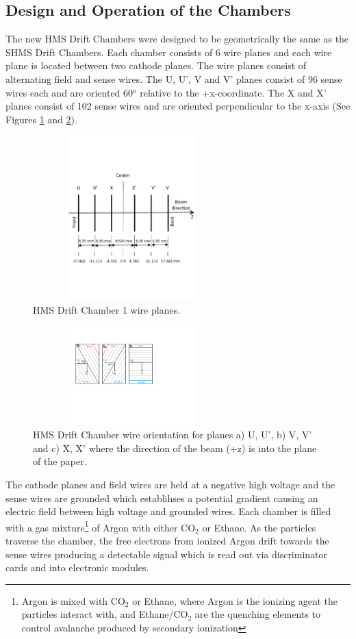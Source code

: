 \documentclass[letterpaper, 10 pt, conference]{ieeeconf}  %
\begin{document}
\subsection{Design and Operation of the Chambers}
The new HMS Drift Chambers were designed to be geometrically the same as the SHMS Drift Chambers. Each chamber consists of 6 wire planes and each wire
plane is located between two cathode planes. The wire planes consist of alternating field and sense wires. The U, U', V and V' planes consist of
96 sense wires each and are oriented 60$^{o}$ relative to the +x-coordinate. The X and X' planes consist of 102 sense wires and are oriented perpendicular to the x-axis (See
Figures \ref{fig:dc1_planes} and \ref{fig:dc_wires}).
\begin{figure}[h!]
  \centering
  \includegraphics[width=3.0in, height=2.5in]{dc2_tests/HMS_DC1_Planes.pdf}
  \caption{HMS Drift Chamber 1 wire planes.}
  \label{fig:dc1_planes}
\end{figure}
\begin{figure}[h!]
  \centering
  \includegraphics[width=3.0in, height=1.5in]{dc2_tests/HMS_DC_Wires.pdf}
  \caption{HMS Drift Chamber wire orientation for planes a) U, U', b) V, V' and c) X, X' where
  the direction of the beam (+z) is into the plane of the paper.}
  \label{fig:dc_wires}
\end{figure}
The cathode planes and field wires are held at a negative high voltage and the sense wires are grounded which establihses a potential gradient causing an electric field
between high voltage and grounded wires. Each chamber is filled with a gas mixture\footnote{Argon is mixed with CO$_{2}$ or Ethane, where Argon is the ionizing agent the
particles interact with, and Ethane/CO$_{2}$ are the quenching elements to control avalanche produced by secondary ionization} of Argon with either CO$_{2}$ or Ethane.
As the particles traverse the chamber, the free electrons from ionized Argon drift towards the sense wires producing a detectable signal which is read out via discriminator
cards and into electronic modules.
\end{document}
